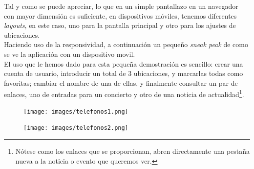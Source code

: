 \documentclass[../ei103948-project-documentation.tex]{subfiles}
\begin{document}
                                Tal y como se puede apreciar, lo que en un simple pantallazo en un navegador con mayor dimensión es suficiente, en dispositivos móviles, tenemos diferentes \textit{layouts}, en este caso, uno para la pantalla principal y otro para los ajustes de ubicaciones.\\

                                Haciendo uso de la responsividad, a continuación un pequeño \textit{sneak peak} de como se ve la aplicación con un dispositivo movil.\\
                                
                                El uso que le hemos dado para esta pequeña demostración es sencillo: crear una cuenta de usuario, introducir un total de 3 ubicaciones, y marcarlas todas como favoritas; cambiar el nombre de una de ellas, y finalmente consultar un par de enlaces, uno de entradas para un concierto y otro de una noticia de actualidad\footnote{Nótese como los enlaces que se proporcionan, abren directamente una pestaña nueva a la noticia o evento que queremos ver.}.

                                \newpage

                                \begin{figure}[H]
                                    \begin{center}
                                        \hspace*{-10mm} 
                                    \texttt{[image: images/telefonos1.png]}
                                    \end{center}
                                \end{figure}

                                \newpage

                                \begin{figure}[H]
                                    \begin{center}
                                        \hspace*{-10mm} 
                                    \texttt{[image: images/telefonos2.png]}
                                    \end{center}
                                \end{figure}

                                \newpage



            
\end{document}
